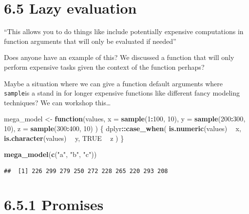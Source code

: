 \documentclass[]{book}
\newenvironment{Shaded}{\begin{snugshade}}{\end{snugshade}}
\newcommand{\ControlFlowTok}[1]{\textcolor[rgb]{0.13,0.29,0.53}{\textbf{#1}}}
\newcommand{\DataTypeTok}[1]{\textcolor[rgb]{0.13,0.29,0.53}{#1}}
\newcommand{\DecValTok}[1]{\textcolor[rgb]{0.00,0.00,0.81}{#1}}
\newcommand{\KeywordTok}[1]{\textcolor[rgb]{0.13,0.29,0.53}{\textbf{#1}}}
\newcommand{\NormalTok}[1]{#1}
\newcommand{\OperatorTok}[1]{\textcolor[rgb]{0.81,0.36,0.00}{\textbf{#1}}}
\newcommand{\OtherTok}[1]{\textcolor[rgb]{0.56,0.35,0.01}{#1}}
\newcommand{\StringTok}[1]{\textcolor[rgb]{0.31,0.60,0.02}{#1}}
\begin{document}
\hypertarget{lazy-evaluation}{%
\section*{6.5 Lazy evaluation}\label{lazy-evaluation}}

``This allows you to do things like include potentially expensive computations in function arguments that will only be evaluated if needed''

Does anyone have an example of this? We discussed a function that will only perform expensive tasks given the context of the function perhaps?

Maybe a situation where we can give a function default arguments where \texttt{sample}is a stand in for longer expensive functions like different fancy modeling techniques? We can workshop this\ldots{}

\begin{Shaded}
\begin{Highlighting}[]
\NormalTok{mega_model <-}\StringTok{ }\ControlFlowTok{function}\NormalTok{(values, }\DataTypeTok{x =} \KeywordTok{sample}\NormalTok{(}\DecValTok{1}\OperatorTok{:}\DecValTok{100}\NormalTok{, }\DecValTok{10}\NormalTok{), }\DataTypeTok{y =} \KeywordTok{sample}\NormalTok{(}\DecValTok{200}\OperatorTok{:}\DecValTok{300}\NormalTok{, }\DecValTok{10}\NormalTok{), }\DataTypeTok{z =} \KeywordTok{sample}\NormalTok{(}\DecValTok{300}\OperatorTok{:}\DecValTok{400}\NormalTok{, }\DecValTok{10}\NormalTok{)}
\NormalTok{) \{}
\NormalTok{  dplyr}\OperatorTok{::}\KeywordTok{case_when}\NormalTok{(}
    \KeywordTok{is.numeric}\NormalTok{(values) }\OperatorTok{~}\StringTok{ }\NormalTok{x,}
    \KeywordTok{is.character}\NormalTok{(values) }\OperatorTok{~}\StringTok{ }\NormalTok{y,}
    \OtherTok{TRUE} \OperatorTok{~}\StringTok{ }\NormalTok{z}
\NormalTok{  )}
\NormalTok{\}}

\KeywordTok{mega_model}\NormalTok{(}\KeywordTok{c}\NormalTok{(}\StringTok{"a"}\NormalTok{, }\StringTok{"b"}\NormalTok{, }\StringTok{"c"}\NormalTok{))}
\end{Highlighting}
\end{Shaded}

\begin{verbatim}
##  [1] 226 299 279 250 272 228 265 220 293 208
\end{verbatim}

\hypertarget{promises}{%
\section*{6.5.1 Promises}\label{promises}}
\end{document}
